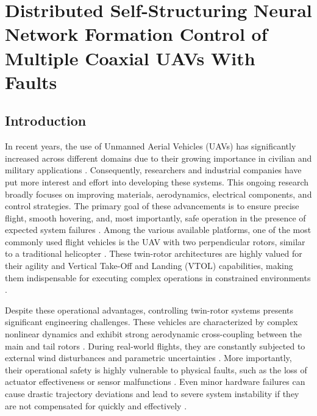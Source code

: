 \chapter{Distributed Self-Structuring Neural Network Formation Control of Multiple Coaxial UAVs With Faults}
\label{chap:formation_control}
\section{Introduction}
\label{sec:ch3_introduction}

In recent years, the use of Unmanned Aerial Vehicles (UAVs) has significantly increased across different domains due to their growing importance in civilian and military applications \cite{UAV_rev, UAV_rev1, Valavanis2015}. Consequently, researchers and industrial companies have put more interest and effort into developing these systems. This ongoing research broadly focuses on improving materials, aerodynamics, electrical components, and control strategies. The primary goal of these advancements is to ensure precise flight, smooth hovering, and, most importantly, safe operation in the presence of expected system failures \cite{Steinberg2021, Zhang2008}. Among the various available platforms, one of the most commonly used flight vehicles is the UAV with two perpendicular rotors, similar to a traditional helicopter \cite{trms_review1, Rahideh2008}. These twin-rotor architectures are highly valued for their agility and Vertical Take-Off and Landing (VTOL) capabilities, making them indispensable for executing complex operations in constrained environments \cite{trms1}.

Despite these operational advantages, controlling twin-rotor systems presents significant engineering challenges. These vehicles are characterized by complex nonlinear dynamics and exhibit strong aerodynamic cross-coupling between the main and tail rotors \cite{NonlinearCoupledDynamics1, trms2}. During real-world flights, they are constantly subjected to external wind disturbances and parametric uncertainties \cite{ExternalDisturbances1}. More importantly, their operational safety is highly vulnerable to physical faults, such as the loss of actuator effectiveness or sensor malfunctions \cite{Isermann2011, ftc_UAV_review2}. Even minor hardware failures can cause drastic trajectory deviations and lead to severe system instability if they are not compensated for quickly and effectively \cite{Steinberg2021}.

